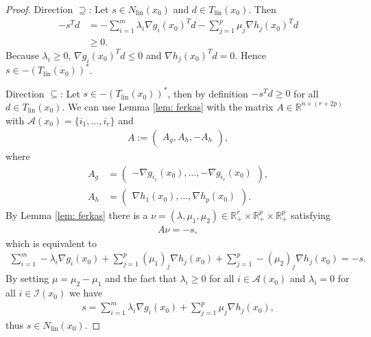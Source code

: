 \begin{proof}
    Direction $\supseteq$: Let $s \in N_{\text{lin} }(x_0)$ and $d \in
    T_{\text{lin} }(x_0)$. Then
    \begin{align}
        -s^{T} d &= -\sum_{i=1}^{m} \lambda_i\nabla g_i(x_0)^{T}d
        -\sum_{j=1}^{p} \mu_j \nabla h_j(x_0)^{T} d\\
                 &\ge 0.
    \end{align}
    Because $\lambda_i \ge0$, $\nabla g_i(x_0)^T d \le 0$ and $\nabla
    h_j(x_0)^{T} d =0 $. Hence $s \in -(T_{\text{lin} }(x_0))^{*}$.

    Direction $\subseteq$: Let $s \in -(T_{\text{lin} }(x_0))^{*}$, then by
    definition $-s^{T} d \ge 0$ for all $d \in T_{\text{lin}}(x_0)$. We can
    use Lemma \ref{lem: ferkas} with the matrix $A \in \mathbb{R}^{n\times
    (r + 2p)}$ with $\mathcal{A}(x_0) = \{i_1, \ldots, i_r\} $ and
    \begin{align}
        A:=\begin{pmatrix} A_g, A_h, -A_h
        \end{pmatrix},
    \end{align}
    where
    \begin{align}
        A_g &=
        \begin{pmatrix}
        -\nabla g_{i_1}(x_0),\ldots,-\nabla g_{i_r}(x_0)
        \end{pmatrix},\\
        A_h &=
        \begin{pmatrix}
            \nabla h_1(x_0),\ldots,\nabla h_p(x_0)
        \end{pmatrix} .
    \end{align}
    By Lemma \ref{lem: ferkas} there is a $\nu = (\lambda, \mu_1, \mu_2) \in
    \mathbb{R}_+^{r}\times \mathbb{R}^{p}_+\times \mathbb{R}_+^{p}$
    satisfying
    \begin{align}
        A\nu = -s,
    \end{align}
    which is equivalent to
    \begin{align}
        \sum_{i=1}^{m} -\lambda_i\nabla g_i(x_0)
        +\sum_{j=1}^{p} (\mu_1)_j\nabla h_j(x_0)
        +\sum_{j=1}^{p} -(\mu_2)_j\nabla h_j(x_0) = -s.
    \end{align}
    By setting $\mu = \mu_2 - \mu_1$ and the fact that $\lambda_i \ge 0$ for
    all $i \in \mathcal{A}(x_0)$ and $ \lambda_i =0$ for all $i \in
    \mathcal{I}(x_0)$ we have
    \begin{align}
       s =  \sum_{i=1}^{m} \lambda_i\nabla g_i(x_0)
        +\sum_{j=1}^{p} \mu_j\nabla h_j(x_0),
    \end{align}
    thus $s \in N_{\text{lin}}(x_0)$.
\end{proof}

